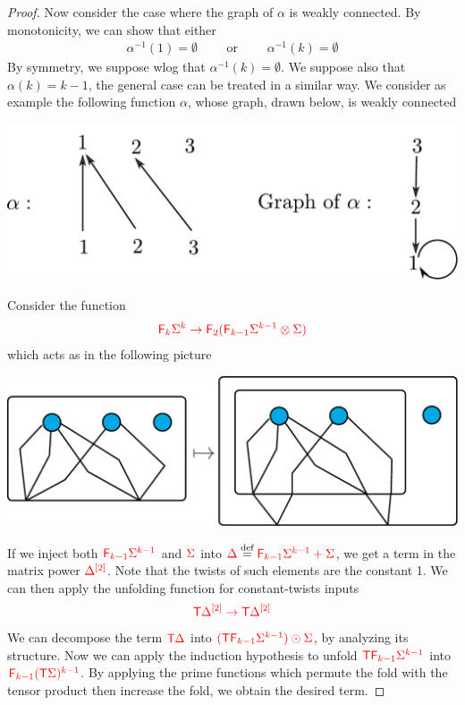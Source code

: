 \begin{proof}
Now consider the case where the graph of $\alpha$ is weakly connected. By monotonicity, we can show that either
\begin{align*}
\alpha^{-1}(1)=\emptyset\qquad\text{ or }\qquad\alpha^{-1}(k)=\emptyset
\end{align*}
By symmetry, we suppose wlog that $\alpha^{-1}(k)=\emptyset$. We suppose also that $\alpha(k)=k-1$, the general case can be treated in a similar way.
We consider as example the following function $\alpha$, whose graph, drawn below, is weakly connected
\begin{center}
\includegraphics[scale=.4]{graph-of-alpha}
\end{center}
Consider the function
\begin{align*}
{\color{red}{{\color{red}{\mathsf F_{k}}}\Sigma^k \to {\color{red}{\mathsf F_{2}}}({\color{red}{\mathsf F_{k-1}}}\Sigma^{k-1}\otimes \Sigma)}}
\end{align*}
which acts as in the following picture
\begin{center}
\includegraphics[scale=.4]{connected-alpha-hom}
\end{center}
If we inject both ${\color{red}{{\color{red}{\mathsf F_{k-1}}}\Sigma^{k-1}}}$ and ${\color{red}{\Sigma}}$ into ${\color{red}{\Delta}}\stackrel{\text{def}}={\color{red}{{\color{red}{\mathsf F_{k-1}}}\Sigma^{k-1}+\Sigma}}$, we get a term in the matrix power ${\color{red}{\Delta}}^{{\color{red}{[2]}}}$. Note that the twists of such elements are the constant 1. We can then apply the unfolding function for constant-twists inputs
\begin{align*}
{\color{red}{{\color{red}{\mathsf T}}\Delta^{{\color{red}{[2]}}} \to {\color{red}{\mathsf T}}\Delta^{{\color{red}{[2]}}}}}
\end{align*}
We can decompose the term ${\color{red}{\mathsf T}} {\color{red}{\Delta}}$ into  ${\color{red}{({\color{red}{\mathsf T}}{\color{red}{\mathsf F_{k-1}}}\Sigma^{k-1})\odot \Sigma}}$, by analyzing its structure. Now we can apply the induction hypothesis to unfold  ${\color{red}{{\color{red}{\mathsf T}}{\color{red}{\mathsf F_{k-1}}}\Sigma^{k-1}}}$ into ${\color{red}{{\color{red}{\mathsf F_{k-1}}}({\color{red}{\mathsf T}}\Sigma)^{k-1}}}$. By applying the prime functions which permute the fold with the tensor product then increase the fold, we obtain the desired term.
\end{proof}


